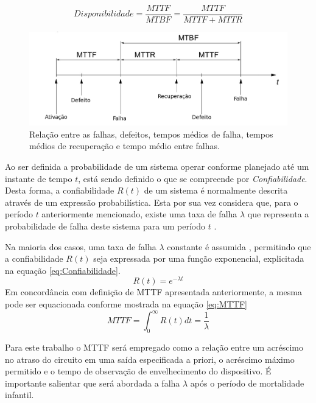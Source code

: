 \begin{equation} \label{eq:Disponibilidade}
Disponibilidade = \frac{MTTF}{MTBF}= \frac{MTTF}{MTTF + MTTR}
\end{equation}

\begin{figure}[H]
\center
\includegraphics[width=1\textwidth]{images/grafico_mttf_mtbf}
\caption{Relação entre as falhas, defeitos, tempos médios de falha, tempos médios de recuperação e tempo médio entre falhas.}
\label{figure:grafico_MTTF_MTBF}
\end{figure}
Ao ser definida a probabilidade de um sistema operar conforme planejado até um instante de tempo $t$, está sendo definido o que se compreende por \textit{Confiabilidade}. Desta forma, a confiabilidade $R(t)$ de um sistema é normalmente descrita através de um expressão probabilística. Esta por sua vez considera que, para o período $t$ anteriormente mencionado, existe uma taxa de falha $\lambda$ que representa a probabilidade de falha deste sistema para um período $t$ \cite{Calabro1962}.

Na maioria dos casos, uma taxa de falha $\lambda$ constante é assumida \cite{Koren2007}, permitindo que a confiabilidade $R(t)$ seja expressada por uma função exponencial, explicitada na equação \ref{eq:Confiabilidade}.
\begin{equation} \label{eq:Confiabilidade}
R(t) = \textit{e}^{-\lambda t}
\end{equation}
Em concordância com definição de MTTF apresentada anteriormente, a mesma pode ser equacionada conforme mostrada na equação \ref{eq:MTTF}
\begin{equation} \label{eq:MTTF}
MTTF = \int_{0}^{\infty} R(t)dt = \frac{1}{\lambda}
\end{equation}

Para este trabalho o MTTF será empregado como a relação entre um acréscimo no atraso do circuito em uma saída especificada a priori, o acréscimo máximo permitido e o tempo de observação de envelhecimento do dispositivo. É importante salientar que  será abordada a falha $\lambda$ após o período de mortalidade infantil.
